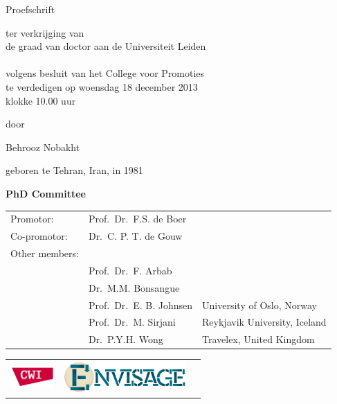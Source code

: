 \begin{titlepage}
\begin{center}
\par\vspace {2.1cm}
{\large \textsc Proefschrift}
\par\vspace {1.5cm}
{\large ter verkrijging van\\[.5cm]
de graad van doctor aan de Universiteit Leiden\\[.5cm]
\\[.5cm]
volgens besluit van het College voor Promoties\\[.5cm]
te verdedigen %
op woensdag 18 december 2013\\[.5cm]
klokke 10.00 uur \\[.5cm] }
\par\vspace {1cm} {\large door}
\par \vspace {.5cm} %
{\Large Behrooz Nobakht}    
\par%
{\large geboren te Tehran, Iran, in 1981} %
\end{center}
\clearpage
\noindent%
{\Large\textbf{PhD Committee}}\\[.5cm]

\begin{tabular}{lll}
Promotor:    & Prof.\ Dr.\ F.S. de Boer & \\
Co-promotor: & Dr.\ C. P. T. de Gouw & \\[12pt]
Other members:\\
& Prof.\ Dr.\ F. Arbab & \\
& Dr.\ M.M. Bonsangue & \\
& Prof.\ Dr.\ E. B. Johnsen & University of Oslo, Norway\\
& Prof.\ Dr.\ M. Sirjani & Reykjavik University, Iceland\\
& Dr.\ P.Y.H. Wong & Travelex, United Kingdom\\
\end{tabular}

\vfill
\vspace{5.5cm}

\hspace{-0.5cm}
\begin{tabular}{lll}
\includegraphics[height=0.8cm]{figs/cwi.png} &
\includegraphics[height=1.2cm]{figs/envisage-logo} &
\end{tabular}


\end{titlepage}
